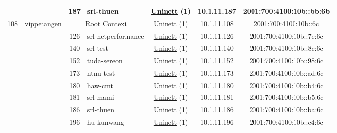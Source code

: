 \begin{small}
\begin{center}
\begin{longtable}{|c|c|c|c|c|c|c|c|}
  &  & \tiny{187} & \multicolumn{1}{|l|}{\tiny{srl-thuen}} & \multicolumn{2}{|c|}{\tiny{\href{https://www.uninett.no}{Uninett} (1)}} & \tiny{10.1.11.187} & \tiny{2001:700:4100:10b::bb:6b} \\ \hline
 \multirow{9}{*}{\tiny{108}} & \multicolumn{1}{|l|}{\multirow{9}{*}{\tiny{vippetangen}}} & \multicolumn{2}{|c|}{\tiny{Root Context}} & \multicolumn{2}{|c|}{\tiny{\href{https://www.uninett.no}{Uninett} (1)}} & \tiny{10.1.11.108} & \tiny{2001:700:4100:10b::6c} \\* \cline{3-3}\cline{4-4}\cline{5-5}\cline{6-6}\cline{7-7}\cline{8-8}
  &  & \tiny{126} & \multicolumn{1}{|l|}{\tiny{srl-netperformance}} & \multicolumn{2}{|c|}{\tiny{\href{https://www.uninett.no}{Uninett} (1)}} & \tiny{10.1.11.126} & \tiny{2001:700:4100:10b::7e:6c} \\* \cline{3-3}\cline{4-4}\cline{5-5}\cline{6-6}\cline{7-7}\cline{8-8}
  &  & \tiny{140} & \multicolumn{1}{|l|}{\tiny{srl-test}} & \multicolumn{2}{|c|}{\tiny{\href{https://www.uninett.no}{Uninett} (1)}} & \tiny{10.1.11.140} & \tiny{2001:700:4100:10b::8c:6c} \\* \cline{3-3}\cline{4-4}\cline{5-5}\cline{6-6}\cline{7-7}\cline{8-8}
  &  & \tiny{152} & \multicolumn{1}{|l|}{\tiny{tuda-sereon}} & \multicolumn{2}{|c|}{\tiny{\href{https://www.uninett.no}{Uninett} (1)}} & \tiny{10.1.11.152} & \tiny{2001:700:4100:10b::98:6c} \\* \cline{3-3}\cline{4-4}\cline{5-5}\cline{6-6}\cline{7-7}\cline{8-8}
  &  & \tiny{173} & \multicolumn{1}{|l|}{\tiny{ntnu-test}} & \multicolumn{2}{|c|}{\tiny{\href{https://www.uninett.no}{Uninett} (1)}} & \tiny{10.1.11.173} & \tiny{2001:700:4100:10b::ad:6c} \\* \cline{3-3}\cline{4-4}\cline{5-5}\cline{6-6}\cline{7-7}\cline{8-8}
  &  & \tiny{180} & \multicolumn{1}{|l|}{\tiny{haw-cmt}} & \multicolumn{2}{|c|}{\tiny{\href{https://www.uninett.no}{Uninett} (1)}} & \tiny{10.1.11.180} & \tiny{2001:700:4100:10b::b4:6c} \\* \cline{3-3}\cline{4-4}\cline{5-5}\cline{6-6}\cline{7-7}\cline{8-8}
  &  & \tiny{181} & \multicolumn{1}{|l|}{\tiny{srl-mami}} & \multicolumn{2}{|c|}{\tiny{\href{https://www.uninett.no}{Uninett} (1)}} & \tiny{10.1.11.181} & \tiny{2001:700:4100:10b::b5:6c} \\* \cline{3-3}\cline{4-4}\cline{5-5}\cline{6-6}\cline{7-7}\cline{8-8}
  &  & \tiny{186} & \multicolumn{1}{|l|}{\tiny{srl-thuen}} & \multicolumn{2}{|c|}{\tiny{\href{https://www.uninett.no}{Uninett} (1)}} & \tiny{10.1.11.186} & \tiny{2001:700:4100:10b::ba:6c} \\* \cline{3-3}\cline{4-4}\cline{5-5}\cline{6-6}\cline{7-7}\cline{8-8}
  &  & \tiny{196} & \multicolumn{1}{|l|}{\tiny{hu-kunwang}} & \multicolumn{2}{|c|}{\tiny{\href{https://www.uninett.no}{Uninett} (1)}} & \tiny{10.1.11.196} & \tiny{2001:700:4100:10b::c4:6c} \\ \hline
\end{longtable}
\end{center}
\end{small}



